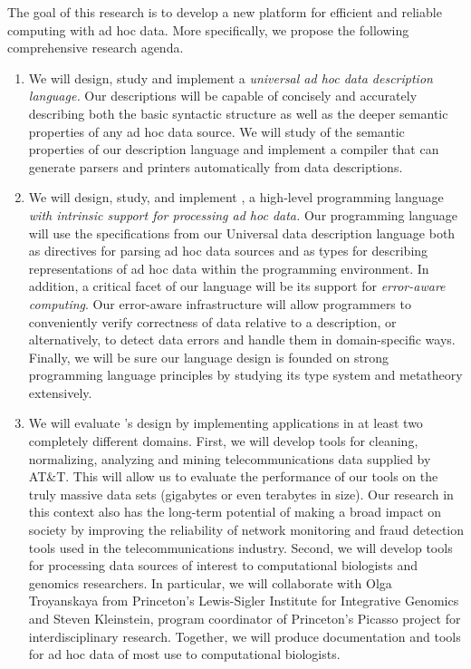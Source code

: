 \documentclass[11pt]{article}
\begin{document}
The goal of this research is to develop a new platform for
efficient and reliable computing with ad hoc data.
More specifically, we propose the following comprehensive 
research agenda.

\begin{enumerate}
\item We will design, study and implement
a {\em universal ad hoc data description language.}
Our descriptions will be capable of
concisely and accurately describing both the basic syntactic structure
as well as the deeper semantic properties of any ad hoc data source.
We will study of the semantic properties of our description language
and implement a compiler that can
generate parsers and printers 
automatically from data descriptions.

\item We will design, study, and implement  \datatype{}, a 
high-level programming language {\em with 
intrinsic support for 
processing ad hoc data.}  Our programming language will use the
specifications from our Universal data description language 
both as directives for
parsing ad hoc data sources and as types for describing
representations of ad hoc data within the programming environment.  
In addition,
a critical facet of our language will be its support for
{\em error-aware computing}.  Our error-aware infrastructure 
will allow programmers to conveniently
verify correctness of data relative to a description, or 
alternatively, to detect data errors and handle them in domain-specific
ways.  Finally, we will be sure
our language design is founded on
strong programming language principles by
studying its type system and metatheory extensively. 

\item We will evaluate \datatype's design by implementing 
applications in at least two completely different domains.  First, we will
develop tools for cleaning, normalizing, analyzing and mining
telecommunications data supplied by AT\&T.  This will allow
us to evaluate the performance of our tools on the truly
massive data sets (gigabytes or even terabytes in size).  
Our research in this context also has the 
long-term potential of making
a broad impact on society by improving the reliability of network
monitoring and fraud detection tools
used in the telecommunications industry.  Second, we 
will develop tools for processing data sources of 
interest to computational biologists and genomics researchers.  
In particular, we will collaborate with
Olga Troyanskaya from Princeton's Lewis-Sigler Institute for 
Integrative Genomics and Steven Kleinstein, program coordinator of Princeton's
Picasso project for interdisciplinary research.
Together, we will produce documentation and tools for
ad hoc data of most use to computational biologists.


\end{enumerate}
\end{document}
